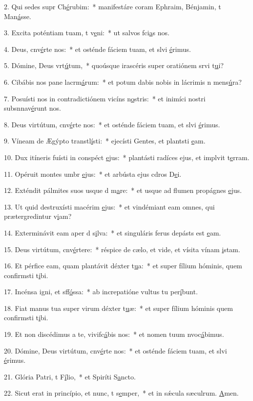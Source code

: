2. Qui sedes supr Ch\uline{é}rubim:~* manifestáre coram Ephraim, Bénjamin, t Man\uline{á}sse.\par 
3. Excita poténtiam tuam, t v\uline{e}ni:~* ut salvos fci\uline{a}s nos.\par 
4. Deus, cnv\uline{é}rte nos:~* et osténde fáciem tuam, et slvi \uline{é}rimus.\par 
5. Dómine, Deus vrt\uline{ú}tum,~* quoúsque irascéris super oratiónem srvi t\uline{u}i?\par 
6. Cibábis nos pane lacrm\uline{á}rum:~* et potum dabis nobis in lácrimis n mens\uline{ú}ra?\par 
7. Posuísti nos in contradictiónem vicíns n\uline{o}stris:~* et inimíci nostri subsnnav\uline{é}runt nos.\par 
8. Deus virtútum, cnv\uline{é}rte nos:~* et osténde fáciem tuam, et slvi \uline{é}rimus.\par 
9. Víneam de Ægýpto transtl\uline{í}sti:~* ejecísti Gentes, et plantsti \uline{e}am.\par 
10. Dux itíneris fuísti in conspéct \uline{e}jus:~* plantásti radíces ejus, et implvit t\uline{e}rram.\par 
11. Opéruit montes umbr \uline{e}jus:~* et arbústa ejus cdros D\uline{e}i.\par 
12. Exténdit pálmites suos usque d m\uline{a}re:~* et usque ad flumen propágnes \uline{e}jus.\par 
13. Ut quid destruxísti macérim \uline{e}jus:~* et vindémiant eam omnes, qui prætergredintur v\uline{i}am?\par 
14. Exterminávit eam aper d s\uline{i}lva:~* et singuláris ferus depásts est \uline{e}am.\par 
15. Deus virtútum, cnv\uline{é}rtere:~* réspice de cælo, et vide, et vísita vínam \uline{i}stam.\par 
16. Et pérfice eam, quam plantávit déxter t\uline{u}a:~* et super fílium hóminis, quem confirmsti t\uline{i}bi.\par 
17. Incénsa igni, et sff\uline{ó}ssa:~* ab increpatióne vultus tu per\uline{í}bunt.\par 
18. Fiat manus tua super virum déxter t\uline{u}æ:~* et super fílium hóminis quem confirmsti t\uline{i}bi.\par 
19. Et non discédimus a te, vivifc\uline{á}bis nos:~* et nomen tuum nvoc\uline{á}bimus.\par 
20. Dómine, Deus virtútum, cnv\uline{é}rte nos:~* et osténde fáciem tuam, et slvi \uline{é}rimus.\par 
21. Glória Patri, t F\uline{í}lio,~* et Spiríti S\uline{a}ncto.\par 
22. Sicut erat in princípio, et nunc, t s\uline{e}mper,~* et in sǽcula sæculrum. \uline{A}men.\par 
